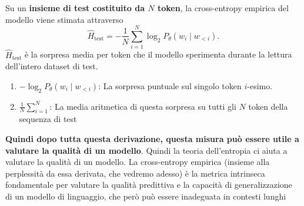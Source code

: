 Su un \textbf{insieme di test costituito da $N$ token}, la cross-entropy empirica del modello viene stimata attraverso
\begin{equation}
\widehat H_{\mathrm{test}}=-\frac1N\sum_{i=1}^{N}\log_2 P_\theta(w_i\mid w_{<i}).
\end{equation}
$\hat{H}_{\text{test}}$ è la sorpresa media per token che il modello sperimenta durante la lettura dell'intero dataset di test.
\begin{enumerate}
    \item $-\log_2 P_\theta(w_i \mid w_{<i})$: La sorpresa puntuale sul singolo token $i$-esimo.
    \item $\frac{1}{N}\sum_{i=1}^N$: La media aritmetica di questa sorpresa su tutti gli $N$ token della sequenza di test
\end{enumerate}
\textbf{Quindi dopo tutta questa derivazione, questa misura può essere utile a valutare la qualità di un modello}.
Quindi la teoria dell'entropia ci aiuta a valutare la qualità di un modello.
La cross-entropy empirica (insieme alla perplessità da essa derivata, che vedremo adesso) è la metrica intrinseca fondamentale per valutare la qualità predittiva e la capacità di generalizzazione di un modello di linguaggio, che però può essere inadeguata in contesti lunghi
